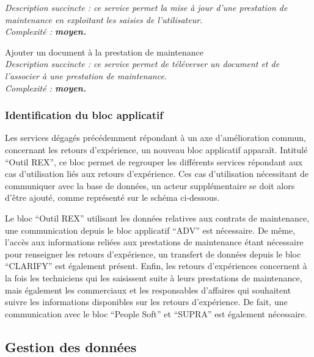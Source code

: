 \begin{description}
        \it{Description succincte :} ce service permet la mise à jour d’une prestation de maintenance en exploitant les saisies de l’utilisateur. \\
        \it{Complexité :} \bf{moyen}.
    \item[\textbullet] Ajouter un document à la prestation de maintenance \\
        \it{Description succincte :} ce service permet de téléverser un document et de l’associer à une prestation de maintenance. \\
        \it{Complexité :} \bf{moyen}.
\end{description}

\subsubsection{Identification du bloc applicatif}

Les services dégagés précédemment répondant à un axe d’amélioration commun, concernant les retours d’expérience, un nouveau bloc applicatif apparaît. Intitulé “Outil REX”, ce bloc permet de regrouper les différents services répondant aux cas d’utilisation liés aux retours d’expérience. Ces cas d’utilisation nécessitant de communiquer avec la base de données, un acteur supplémentaire se doit alors d’être ajouté, comme représenté sur le schéma ci-dessous.


Le bloc “Outil REX” utilisant les données relatives aux contrats de maintenance, une communication depuis le bloc applicatif “ADV” est nécessaire. De même, l’accès aux informations reliées aux prestations de maintenance étant nécessaire pour renseigner les retours d’expérience, un transfert de données depuis le bloc “CLARIFY” est également présent. Enfin, les retours d’expériences concernent à la fois les techniciens qui les saisissent suite à leurs prestations de maintenance, mais également les commerciaux et les responsables d’affaires qui souhaitent suivre les informations disponibles sur les retours d’expérience. De fait, une communication avec le bloc “People Soft” et “SUPRA” est également nécessaire.


\subsection{Gestion des données}

